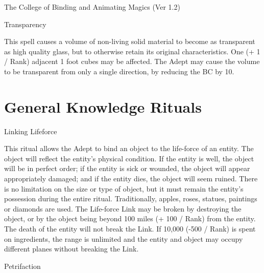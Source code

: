 \begin{Chapter}{The College of Binding and Animating Magics (Ver 1.2)}
\begin{spell}[G-10]{Transparency}
\begin{effects}
This spell causes a volume of non-living solid material to become as
transparent as high quality glass, but to otherwise retain its
original characteristics.  One (+ 1 / Rank) adjacent 1 foot cubes may
be affected.  The Adept may cause the volume to be transparent from
only a single direction, by reducing the BC by 10.
\end{effects}
\end{spell}


\section{General Knowledge Rituals}

\begin{ritual}[Q-1]{Linking Lifeforce}

\begin{effects}
This ritual allows the Adept to bind an object to the life-force of an
entity. The object will reflect the entity’s physical condition.  If
the entity is well, the object will be in perfect order; if the entity
is sick or wounded, the object will appear appropriately damaged; and
if the entity dies, the object will seem ruined.  There is no
limitation on the size or type of object, but it must remain the
entity’s possession during the entire ritual.  Traditionally, apples,
roses, statues, paintings or diamonds are used.  The Life-force Link
may be broken by destroying the object, or by the object being beyond
100 miles (+ 100 / Rank) from the entity.  The death of the entity
will not break the Link.  If 10,000 (-500 / Rank) is spent on
ingredients, the range is unlimited and the entity and object may
occupy different planes without breaking the Link.
\end{effects}
\end{ritual}

\begin{ritual}[Q-2]{Petrifaction}


\end{ritual}
\end{Chapter}
